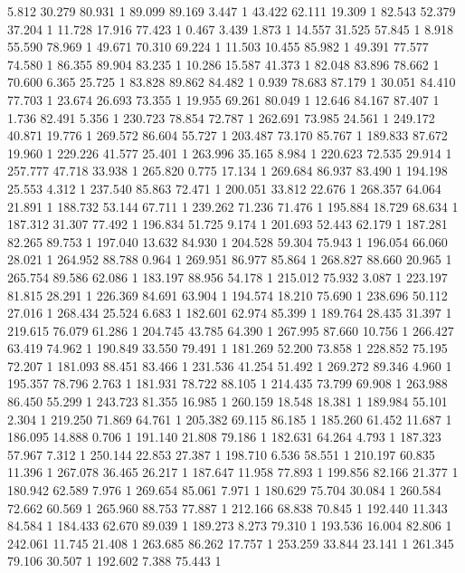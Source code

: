 	5.812	30.279	80.931	1
	89.099	89.169	3.447	1
	43.422	62.111	19.309	1
	82.543	52.379	37.204	1
	11.728	17.916	77.423	1
	0.467	3.439	1.873	1
	14.557	31.525	57.845	1
	8.918	55.590	78.969	1
	49.671	70.310	69.224	1
	11.503	10.455	85.982	1
	49.391	77.577	74.580	1
	86.355	89.904	83.235	1
	10.286	15.587	41.373	1
	82.048	83.896	78.662	1
	70.600	6.365	25.725	1
	83.828	89.862	84.482	1
	0.939	78.683	87.179	1
	30.051	84.410	77.703	1
	23.674	26.693	73.355	1
	19.955	69.261	80.049	1
	12.646	84.167	87.407	1
	1.736	82.491	5.356	1
	230.723	78.854	72.787	1
	262.691	73.985	24.561	1
	249.172	40.871	19.776	1
	269.572	86.604	55.727	1
	203.487	73.170	85.767	1
	189.833	87.672	19.960	1
	229.226	41.577	25.401	1
	263.996	35.165	8.984	1
	220.623	72.535	29.914	1
	257.777	47.718	33.938	1
	265.820	0.775	17.134	1
	269.684	86.937	83.490	1
	194.198	25.553	4.312	1
	237.540	85.863	72.471	1
	200.051	33.812	22.676	1
	268.357	64.064	21.891	1
	188.732	53.144	67.711	1
	239.262	71.236	71.476	1
	195.884	18.729	68.634	1
	187.312	31.307	77.492	1
	196.834	51.725	9.174	1
	201.693	52.443	62.179	1
	187.281	82.265	89.753	1
	197.040	13.632	84.930	1
	204.528	59.304	75.943	1
	196.054	66.060	28.021	1
	264.952	88.788	0.964	1
	269.951	86.977	85.864	1
	268.827	88.660	20.965	1
	265.754	89.586	62.086	1
	183.197	88.956	54.178	1
	215.012	75.932	3.087	1
	223.197	81.815	28.291	1
	226.369	84.691	63.904	1
	194.574	18.210	75.690	1
	238.696	50.112	27.016	1
	268.434	25.524	6.683	1
	182.601	62.974	85.399	1
	189.764	28.435	31.397	1
	219.615	76.079	61.286	1
	204.745	43.785	64.390	1
	267.995	87.660	10.756	1
	266.427	63.419	74.962	1
	190.849	33.550	79.491	1
	181.269	52.200	73.858	1
	228.852	75.195	72.207	1
	181.093	88.451	83.466	1
	231.536	41.254	51.492	1
	269.272	89.346	4.960	1
	195.357	78.796	2.763	1
	181.931	78.722	88.105	1
	214.435	73.799	69.908	1
	263.988	86.450	55.299	1
	243.723	81.355	16.985	1
	260.159	18.548	18.381	1
	189.984	55.101	2.304	1
	219.250	71.869	64.761	1
	205.382	69.115	86.185	1
	185.260	61.452	11.687	1
	186.095	14.888	0.706	1
	191.140	21.808	79.186	1
	182.631	64.264	4.793	1
	187.323	57.967	7.312	1
	250.144	22.853	27.387	1
	198.710	6.536	58.551	1
	210.197	60.835	11.396	1
	267.078	36.465	26.217	1
	187.647	11.958	77.893	1
	199.856	82.166	21.377	1
	180.942	62.589	7.976	1
	269.654	85.061	7.971	1
	180.629	75.704	30.084	1
	260.584	72.662	60.569	1
	265.960	88.753	77.887	1
	212.166	68.838	70.845	1
	192.440	11.343	84.584	1
	184.433	62.670	89.039	1
	189.273	8.273	79.310	1
	193.536	16.004	82.806	1
	242.061	11.745	21.408	1
	263.685	86.262	17.757	1
	253.259	33.844	23.141	1
	261.345	79.106	30.507	1
	192.602	7.388	75.443	1
